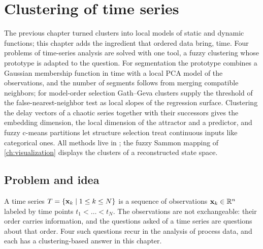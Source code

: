 \chapter{Clustering of time series}\label{ch:timeseries}
\begin{roadmap}
The previous chapter turned clusters into local models of static and dynamic functions; this chapter adds the ingredient that ordered data bring, time. Four problems of time-series analysis are solved with one tool, a fuzzy clustering whose prototype is adapted to the question. For segmentation the prototype combines a Gaussian membership function in time with a local PCA model of the observations, and the number of segments follows from merging compatible neighbors; for model-order selection Gath--Geva clusters supply the threshold of the false-nearest-neighbor test as local slopes of the regression surface. Clustering the delay vectors of a chaotic series together with their successors gives the embedding dimension, the local dimension of the attractor and a predictor, and fuzzy c-means partitions let structure selection treat continuous inputs like categorical ones. All methods live in ; the fuzzy Sammon mapping of \cref{ch:visualization} displays the clusters of a reconstructed state space.
\end{roadmap}

\section{Problem and idea}\label{sec:ts:problem}

A time series $T=\{\mathbf{x}_k\mid 1\le k\le N\}$ is a sequence of observations $\mathbf{x}_k\in\mathbb{R}^n$ labeled by time points $t_1<\dots<t_N$. The observations are not exchangeable: their order carries information, and the questions asked of a time series are questions about that order. Four such questions recur in the analysis of process data, and each has a clustering-based answer in this chapter.

